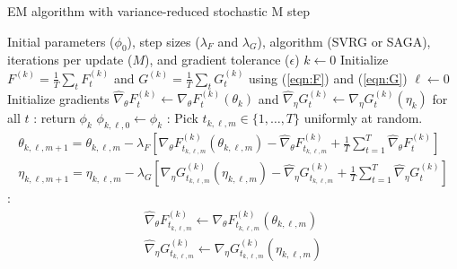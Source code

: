 \begin{algorithm}
\caption{EM algorithm with variance-reduced stochastic M step}\label{alg:EM-SO}
\begin{algorithmic}[1]
\Require Initial parameters ($\phi_{0}$), step sizes ($\lambda_F$ and $\lambda_G$), algorithm (SVRG or SAGA), iterations per update ($M$), and gradient tolerance ($\epsilon$)
%
\State $k \gets 0$
%
\vspace{10pt}
%
\State Initialize $F^{(k)} = \frac{1}{T} \sum_t F_t^{(k)}$ and $G^{(k)} = \frac{1}{T} \sum_t G_t^{(k)}$ using (\ref{eqn:F}) and (\ref{eqn:G})
%
%
\vspace{10pt}
%
\State $\ell \gets 0$
%
\vspace{10pt}
%
\State Initialize gradients $\widehat \nabla_\theta F_t^{(k)} \gets \nabla_\theta F_t^{(k)} (\theta_k)$ and $\widehat \nabla_\eta G_t^{(k)} \gets \nabla_\eta G_t^{(k)} (\eta_k)$ for all $t$
%
\vspace{10pt}
%
:
    \State return $\phi_{k}$
\EndIf
%
\vspace{10pt}
%
\State $\phi_{k,\ell,0} \gets \phi_k$
%
\vspace{10pt}
%
:
    \State Pick $t_{k,\ell,m} \in \{1,\ldots,T\}$ uniformly at random.
    \State
    \begin{gather}
        \theta_{k,\ell,m+1} = \theta_{k,\ell,m} - \lambda_F \left[\nabla_\theta F_{t_{k,\ell,m}}^{(k)}(\theta_{k,\ell,m}) - \widehat \nabla_\theta F_{t_{k,\ell,m}}^{(k)} + \frac{1}{T} \sum_{t=1}^T \widehat \nabla_\theta F^{(k)}_{t} \right] \label{eqn:update_F} \\
        \eta_{k,\ell,m+1} = \eta_{k,\ell,m} - \lambda_G \left[\nabla_\eta G_{t_{k,\ell,m}}^{(k)}(\eta_{k,\ell,m}) - \widehat \nabla_\eta G_{t_{k,\ell,m}}^{(k)} + \frac{1}{T} \sum_{t=1}^T \widehat \nabla_\eta G^{(k)}_{t} \right] \label{eqn:update_G} 
    \end{gather}
    :
        \begin{gather}
            \widehat \nabla_\theta F_{t_{k,\ell,m}}^{(k)} \gets \nabla_\theta F_{t_{k,\ell,m}}^{(k)}(\theta_{k,\ell,m}) \\
            \widehat \nabla_\eta G_{t_{k,\ell,m}}^{(k)} \gets \nabla_\eta G_{t_{k,\ell,m}}^{(k)}(\eta_{k,\ell,m})
        \end{gather}
    \EndIf
\EndFor

\end{algorithmic}
\end{algorithm}
